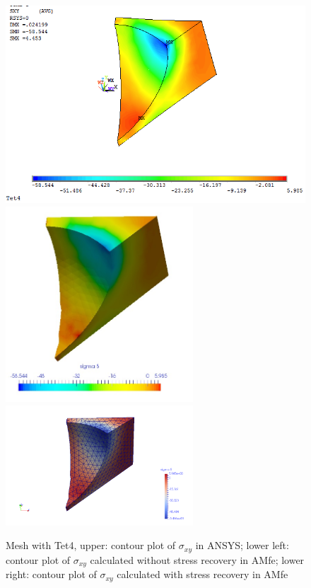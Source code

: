 \begin{figure}[htbp]
	\begin{center}
		\includegraphics[width=13cm,clip]{Tet4Sxy.png} 		
		\includegraphics[width=7cm,clip]{Tet4SxyPD.png} 	
		\includegraphics[width=7cm,clip]{Tet4SxyP.png} 		
		\caption{Mesh with Tet4, upper: contour plot of $\sigma_{xy}$ in ANSYS; lower left: contour plot of $\sigma_{xy}$ calculated without stress recovery in AMfe; lower right: contour plot of $\sigma_{xy}$ calculated with stress recovery in AMfe} \label{fig: Tet4_Sxy}
	\end{center}
\end{figure}
\clearpage 

